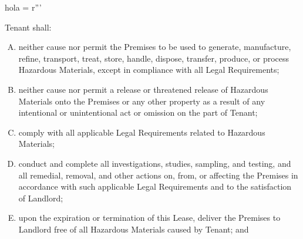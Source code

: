 hola = r'''\documentclass{article}
\begin{document}
    \begin{minipage}{\textwidth}
    Tenant shall:
    \begin{enumerate}[(A)]

    \item	neither cause nor permit the Premises to be used to generate, manufacture, refine, transport, treat, store, handle, dispose, transfer, produce, or process Hazardous Materials, except in compliance with all Legal Requirements;

    \item	neither cause nor permit a release or threatened release of Hazardous Materials onto the Premises or any other property as a result of any intentional or unintentional act or omission on the part of Tenant;

    \item	comply with all applicable Legal Requirements related to Hazardous Materials;

    \item	conduct and complete all investigations, studies, sampling, and testing, and all remedial, removal, and other actions on, from, or affecting the Premises in accordance with such applicable Legal Requirements and to the satisfaction of Landlord;

    \item	upon the expiration or termination of this Lease, deliver the Premises to Landlord free of all Hazardous Materials caused by Tenant; and


\end{enumerate}
\end{minipage}
\end{document}
